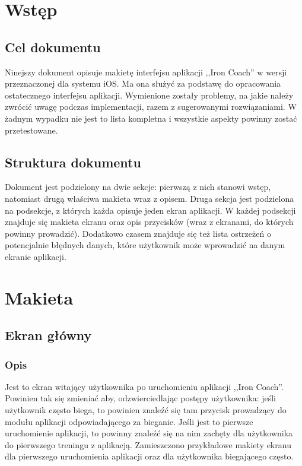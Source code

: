 

\setcounter{tocdepth}{2}
\tableofcontents
\clearpage
\section{Wstęp}
\subsection{Cel dokumentu}
\noindent Ninejszy dokument opisuje makietę interfejsu aplikacji ,,Iron Coach'' w wersji przeznaczonej dla systemu iOS. Ma ona służyć za podstawę do opracowania ostatecznego interfejsu aplikacji. Wymienione zostały problemy, na jakie należy zwrócić uwagę podczas implementacji, razem z sugerowanymi rozwiązaniami. W żadnym wypadku nie jest to lista kompletna i wszystkie aspekty powinny zostać przetestowane.
\subsection{Struktura dokumentu}
\noindent Dokument jest podzielony na dwie sekcje: pierwszą z nich stanowi wstęp, natomiast drugą właściwa makieta wraz z opisem. Druga sekcja jest podzielona na podsekcje, z których każda opisuje jeden ekran aplikacji. W każdej podsekcji znajduje się makieta ekranu oraz opis przycisków (wraz z ekranami, do których powinny prowadzić). Dodatkowo czasem znajduje się też lista ostrzeżeń o potencjalnie błędnych danych, które użytkownik może wprowadzić na danym ekranie aplikacji.
\section{Makieta}
\subsection{Ekran główny}
\subsubsection{Opis}
\noindent Jest to ekran witający użytkownika po uruchomieniu aplikacji ,,Iron Coach''. Powinien tak się zmieniać aby, odzwierciedlając postępy użytkownika: jeśli użytkownik często biega, to powinien znaleźć się tam przycisk prowadzący do modułu aplikacji odpowiadającego za bieganie. Jeśli jest to pierwsze uruchomienie aplikacji, to powinny znaleźć się na nim zachęty dla użytkownika do pierwszego treningu z aplikacją. Zamieszczono przykładowe makiety ekranu dla pierwszego uruchomienia aplikacji oraz dla użytkownika biegającego często.
